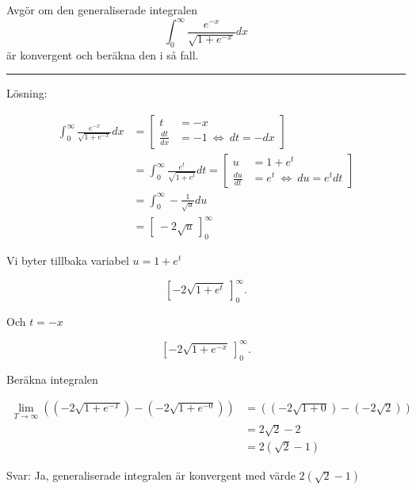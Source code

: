 \documentclass[11pt]{article}
\begin{document}
Avgör om den generaliserade integralen
\[
    \int_0^{\infty} \frac{e^{-x}}{\sqrt{1 + e^{-x}}} dx
\]
är konvergent och beräkna den i så fall.

\noindent\rule{\textwidth}{0.5pt}

Lösning:

\begin{align}
    \int_0^{\infty} \frac{e^{-x}}{\sqrt{1 + e^{-x}}} dx &=
    \left[\begin{aligned}
        t &= -x\\
        \frac{dt}{dx} &= -1 \ \Leftrightarrow\ dt = -dx
    \end{aligned}\right] \\
    &= \int_{0}^{\infty} \frac{e^t}{\sqrt{1 + e^t}} dt =
    \left[\begin{aligned}
        u &= 1 + e^t\\
        \frac{du}{dt} &= e^t \ \Leftrightarrow\ du = e^t dt
    \end{aligned}\right] \\
    &= \int_0^\infty -\frac{1}{\sqrt{u}} du \\
    &= \left[\ -2\sqrt{u}\ \right]_0^{\infty}
\end{align}

Vi byter tillbaka variabel $u = 1 + e^t$

\begin{equation}
   \left[-2\sqrt{1 + e^t}\ \right]_0^{\infty}.
\end{equation}

Och $t = -x$

\begin{equation}
    \left[-2\sqrt{1 + e^{-x}}\ \right]_0^{\infty}.
\end{equation}

Beräkna integralen

\begin{align}
    \lim_{T \rightarrow \infty} \left(\left(-2\sqrt{1 + e^{-T}}\right) - \left(-2\sqrt{1 + e^{-0}}\right)\right) 
    &= \left(\left(-2\sqrt{1 + 0}\right) - \left(-2\sqrt{2}\right)\right) \\
    &= 2\sqrt{2} - 2\\
    &= 2(\sqrt{2} - 1)
\end{align}

Svar: Ja, generaliserade integralen är konvergent med värde $2(\sqrt{2} - 1)$
\end{document}
